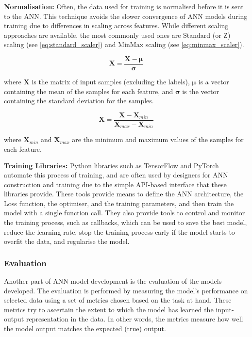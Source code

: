 \textbf{Normalisation:} Often, the data used for training is normalised before it is sent to the ANN. This technique avoids the slower convergence of ANN models during training due to differences in scaling across features. While different scaling approaches are available, the most commonly used ones are Standard (or Z) scaling (see \ref{eq:standard_scaler}) and MinMax scaling (see \ref{eq:minmax_scaler}).

\begin{equation}
 \textbf{X} = \dfrac{\textbf{X} - {\boldsymbol{\mu}}}{{\boldsymbol{\sigma}}}
 \label{eq:standard_scaler}
\end{equation}


where $\textbf{X}$ is the matrix of input samples (excluding the labels), ${\boldsymbol{\mu}}$ is a vector containing the mean of the samples for each feature, and ${\boldsymbol{\sigma}}$ is the vector containing the standard deviation for the samples.

\begin{equation}
 \textbf{X} = \dfrac{\textbf{X} - \textbf{X}_{min}}{\textbf{X}_{max} - \textbf{X}_{min}}
 \label{eq:minmax_scaler}
\end{equation}

where $\textbf{X}_{min}$ and $\textbf{X}_{max}$ are the minimum and maximum values of the samples for each feature.

\textbf{Training Libraries:} Python libraries such as TensorFlow \cite{martin_abadi_tensorflow_2015} and PyTorch \cite{paszke_pytorch_2019} automate this process of training, and are often used by designers for ANN construction and training due to the simple API-based interface that these libraries provide. These tools provide means to define the ANN architecture, the Loss function, the optimiser, and the training parameters, and then train the model with a single function call. They also provide tools to control and monitor the training process, such as callbacks, which can be used to save the best model, reduce the learning rate, stop the training process early if the model starts to overfit the data, and regularise the model.



\subsubsection{Evaluation}
\label{sec:intro_evaluation}
Another part of ANN model development is the evaluation of the models developed. The evaluation is performed by measuring the model's performance on selected data using a set of metrics chosen based on the task at hand. These metrics try to ascertain the extent to which the model has learned the input-output representation in the data. In other words, the metrics measure how well the model output matches the expected (true) output.

